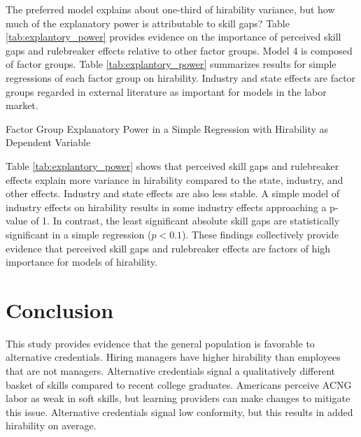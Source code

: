 The preferred model explains about one-third of hirability variance,
but how much of the explanatory power is attributable to skill gaps?
Table \ref{tab:explantory_power} provides evidence on the importance of perceived skill gaps and rulebreaker effects
relative to other factor groups.
Model 4 is composed of factor groups.
Table \ref{tab:explantory_power} summarizes results for simple regressions of each factor group on hirability.
Industry and state effects are factor groups regarded in external literature as important for models in the labor market.

\begin{table}
    \caption{Factor Group Explanatory Power in a Simple Regression with Hirability as Dependent Variable}
    \resizebox{\columnwidth}{!}{
        
    }
    \label{tab:explantory_power}
\end{table}

Table \ref{tab:explantory_power} shows that perceived skill gaps and rulebreaker effects explain more
variance in hirability compared to the state, industry, and other effects.
Industry and state effects are also less stable.
A simple model of industry effects on hirability results in some industry effects approaching a p-value of 1.
In contrast, the least significant absolute skill gaps are statistically significant in a simple regression ($p < 0.1$).
These findings collectively provide evidence that perceived skill gaps and rulebreaker
effects are factors of high importance for models of hirability.

\section{Conclusion}

This study provides evidence that the general population is favorable to alternative credentials.
Hiring managers have higher hirability than employees that are not managers.
Alternative credentials signal a qualitatively different basket of skills compared to recent college graduates.
Americans perceive ACNG labor as weak in soft skills,
but learning providers can make changes to mitigate this issue.
Alternative credentials signal low conformity, but this results in added hirability on average.

